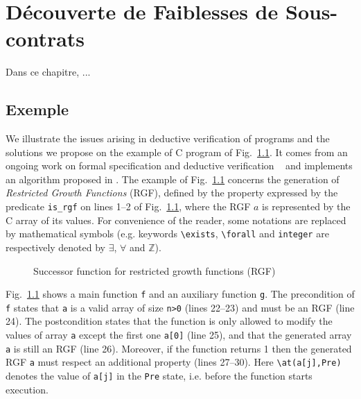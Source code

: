 
\chapter{Découverte de Faiblesses de Sous-contrats}
\label{sec:swd}

\chapterintro

Dans ce chapitre, ...


\section{Exemple}
\label{sec:swd-ex}


We illustrate the issues arising in deductive verification of programs and the
solutions we propose on the example of C program of
Fig.~\ref{fig:rgf1}. It comes from an ongoing work on formal specification and
deductive verification
~\cite{Genestier/TAP15}
and implements an
algorithm proposed in \cite[page 235]{Arndt/10}.
The example of Fig.~\ref{fig:rgf1} 
concerns the generation of
\emph{Restricted Growth Functions} (RGF),
defined by the property expressed by the \acsl
predicate \lstinline{is_rgf} on lines 1--2 of Fig.~\ref{fig:rgf1}, where the RGF
$a$ is represented by the C array
of its values. 
For convenience of the reader, 
some \acsl notations are  replaced by mathematical symbols
(e.g. keywords \lstinline[style=c]{\exists}, \lstinline[style=c]{\forall} and
\lstinline[style=c]{integer} are respectively denoted by $\exists$, $\forall$ and $\mathbb{Z}$).


\begin{figure}[tb]
  \centering
  
  \caption{Successor function for restricted growth functions (RGF)
    \label{fig:rgf1}}
\end{figure}


Fig.~\ref{fig:rgf1} shows a main function \lstinline{f} 
and an auxiliary function \lstinline{g}.
The precondition of \lstinline{f} states that \lstinline{a} is a valid array 
of size  \lstinline{n>0} (lines 22--23) and must be an RGF (line 24).
The postcondition states 
that the function is only allowed to modify the values of array \lstinline{a} except
the first one \lstinline{a[0]} (line 25), 
and that the generated array \lstinline{a} is still an RGF (line 26).
Moreover, if the function returns 1 then the generated RGF \lstinline{a} must
respect an additional property
(lines 27--30).
Here \lstinline{\at(a[j],Pre)} denotes the value of \lstinline{a[j]} in the 
\lstinline{Pre} state, i.e. before the function starts execution.


